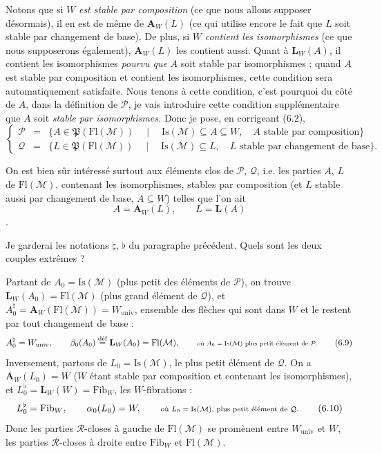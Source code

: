 \documentclass[11pt]{article}
\newcommand{\printedpage}[1]{\marginpar{\footnotesize p.~#1}}
\def\dcprintedpending{}
\newcommand{\msp}[1]{\marginpar{\footnotesize\raggedright
  \ifx\dcprintedpending\empty\else p.~\dcprintedpending\par\fi
  [#1]}\gdef\dcprintedpending{}}
\newcommand{\Fl}{\mathrm{Fl}}
\newcommand{\Pf}{\mathfrak{P}}
\newcommand{\Is}{\mathrm{Is}}
\newcommand{\Fib}{\mathrm{Fib}}
\begin{document}
\msp{page 86}Notons que si $W$ \textit{est stable par composition} (ce que nous allons supposer désormais), il en est de même de $\mathbf{A}_W(L)$ (ce qui utilise encore le fait que $L$ soit stable par changement de base). De plus, si $W$ \textit{contient les isomorphismes} (ce que nous supposerons également), $\mathbf{A}_W(L)$ les contient aussi. Quant à $\mathbf{L}_W(A)$, il contient les isomorphismes \textit{pourvu que} $A$ soit stable par isomorphismes ; quand $A$ est stable par composition et contient les isomorphismes, cette condition sera automatiquement satisfaite. Nous tenons à cette condition, c'est pourquoi du côté de $A$, dans la définition de $\mathcal{P}$, je vais introduire cette condition supplémentaire que $A$ soit \textit{stable par isomorphismes.} Donc je pose, en corrigeant (6.2),
\[
\left\{
\begin{array}{rcl}
\mathcal{P} & = & \{A\in\Pf(\Fl(\mathcal{M}))\quad\mid\quad\mathrm{Is}(\mathcal{M})\subseteq A\subseteq W,\quad A\text{ stable par composition}\}\\[1ex]
\mathcal{Q} & = & \{L\in\Pf(\Fl(\mathcal{M}))\quad\mid\quad\mathrm{Is}(\mathcal{M})\subseteq L,\quad L\text{ stable par changement de base}\}.
\end{array}
\right.
\tag*{(6.7)}
\]

\printedpage{54}
On est bien sûr intéressé surtout aux éléments clos de $\mathcal{P}$, $\mathcal{Q}$, i.e. les parties $A$, $L$ de $\Fl(\mathcal{M})$, contenant les isomorphismes, stables par composition (et $L$ stable aussi par changement de base, $A \subseteq W$) telles que l'on ait
\[
A = \mathbf{A}_W(L), \qquad L = \mathbf{L}(A) \tag*{(6.8)}
\]
.

\msp{page 87}

Je garderai les notations $\natural$, $\flat$ du paragraphe précédent. Quels sont les deux couples extrêmes ?

Partant de $A_0 = \Is(\mathcal{M})$ (plus petit des éléments de $\mathcal{P}$), on trouve $\mathbf{L}_W(A_0) = \Fl(\mathcal{M})$ (plus grand élément de $\mathcal{Q}$), et $A_0^{\natural} = \mathbf{A}_W(\Fl(\mathcal{M})) = W_{\mathrm{univ}}$, ensemble des flèches qui sont dans $W$ et le restent par tout changement de base :
\[
A_0^{\natural} = W_{\mathrm{univ}}, \qquad \beta_0(A_0) \overset{\text{déf}}{=} \mathbf{L}_W(A_0) = \Fl(\mathcal{M}), \qquad \text{\scriptsize où $A_0 = \Is(\mathcal{M})$ plus petit élément de $\mathcal{P}$.} \tag*{(6.9)}
\]
Inversement, partons de $L_0 = \Is(\mathcal{M})$, le plus petit élément de $\mathcal{Q}$. On a $\mathbf{A}_W(L_0) = W$ ($W$ étant stable par composition et contenant les isomorphismes), et $L_0^{\flat} = \mathbf{L}_W(W) = \Fib_W$, les $W$-fibrations :
\[
L_0^{\flat} = \Fib_W, \qquad \alpha_0(L_0) = W, \qquad \text{\scriptsize où $L_0 = \Is(\mathcal{M})$, plus petit élément de $\mathcal{Q}$.} \tag*{(6.10)}
\]
Donc les parties $\mathcal{R}$-closes à gauche de $\Fl(\mathcal{M})$ se promènent entre $W_{\mathrm{univ}}$ et $W$, les parties $\mathcal{R}$-closes à droite entre $\Fib_W$ et $\Fl(\mathcal{M})$.
\end{document}
